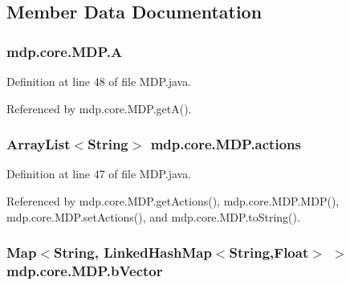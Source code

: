 \subsection{Member Data Documentation}
\hypertarget{classmdp_1_1core_1_1_m_d_p_ac75a611d9f5186893b70b8072bfa0804}{}
\subsubsection[{A}]{ mdp.\+core.\+M\+D\+P.\+A\hspace{0.3cm}{\ttfamily [private]}}\label{classmdp_1_1core_1_1_m_d_p_ac75a611d9f5186893b70b8072bfa0804}


Definition at line 48 of file M\+D\+P.\+java.



Referenced by mdp.\+core.\+M\+D\+P.\+get\+A().

\hypertarget{classmdp_1_1core_1_1_m_d_p_a9da06680f73a486a6ee65c8208151e70}{}
\subsubsection[{actions}]{\setlength{\rightskip}{0pt plus 5cm}Array\+List$<$String$>$ mdp.\+core.\+M\+D\+P.\+actions\hspace{0.3cm}{\ttfamily [private]}}\label{classmdp_1_1core_1_1_m_d_p_a9da06680f73a486a6ee65c8208151e70}


Definition at line 47 of file M\+D\+P.\+java.



Referenced by mdp.\+core.\+M\+D\+P.\+get\+Actions(), mdp.\+core.\+M\+D\+P.\+M\+D\+P(), mdp.\+core.\+M\+D\+P.\+set\+Actions(), and mdp.\+core.\+M\+D\+P.\+to\+String().

\hypertarget{classmdp_1_1core_1_1_m_d_p_a16eff8bad86554cc9f97f674b1625c66}{}
\subsubsection[{b\+Vector}]{\setlength{\rightskip}{0pt plus 5cm}Map$<$String, Linked\+Hash\+Map$<$String,Float$>$ $>$ mdp.\+core.\+M\+D\+P.\+b\+Vector\hspace{0.3cm}{\ttfamily [private]}}\label{classmdp_1_1core_1_1_m_d_p_a16eff8bad86554cc9f97f674b1625c66}


